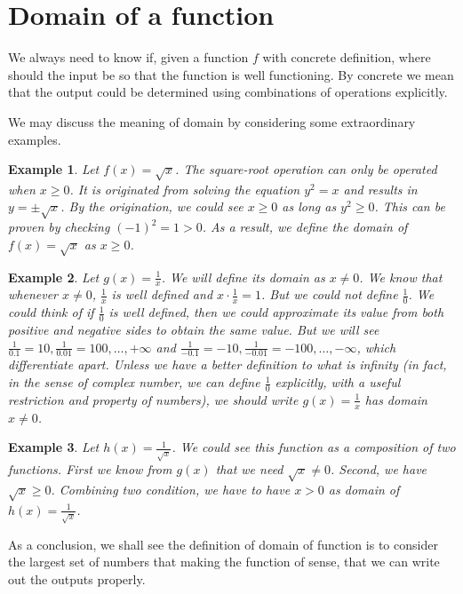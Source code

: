 \documentclass[12pt]{article}
\newtheorem*{example}{Example}
\begin{document}
    \section*{Domain of a function}
    We always need to know if, given a function $f$ with concrete definition, where should the input be so that the function is well functioning. By concrete we mean that the output could be determined using combinations of operations explicitly. 
    
    We may discuss the meaning of domain by considering some extraordinary examples.

    \begin{example}
        Let $f(x)=\sqrt{x}$. The square-root operation can only be operated when $x\geq0$. It is originated from solving the equation $y^2=x$ and results in $y=\pm\sqrt{x}$. By the origination, we could see $x\geq 0$ as long as $y^2\geq 0$. This can be proven by checking $(-1)^2=1>0$. As a result, we define the domain of $f(x)=\sqrt{x}$ as $x\geq0$.
    \end{example}

    \begin{example}
        Let $g(x)=\frac{1}{x}$. We will define its domain as $x\neq 0$. We know that whenever $x\neq 0$, $\frac{1}{x}$ is well defined and $x\cdot\frac{1}{x}=1$. But we could not define $\frac{1}{0}$. We could think of if $\frac{1}{0}$ is well defined, then we could approximate its value from both positive and negative sides to obtain the same value. But we will see $\frac{1}{0.1}=10, \frac{1}{0.01}=100,\dots,+\infty$ and $\frac{1}{-0.1}=-10, \frac{1}{-0.01}=-100,\dots,-\infty$, which differentiate apart. Unless we have a better definition to what is infinity (in fact, in the sense of complex number, we can define $\frac{1}{0}$ explicitly, with a useful restriction and property of numbers), we should write $g(x)=\frac{1}{x}$ has domain $x\neq 0$.
    \end{example}

    \begin{example}
        Let $h(x)=\frac{1}{\sqrt{x}}$. We could see this function as a composition of two functions. First we know from $g(x)$ that we need $\sqrt{x}\neq 0$. Second, we have $\sqrt{x}\geq 0$. Combining two condition, we have to have $x>0$ as domain of $h(x)=\frac{1}{\sqrt{x}}$.
    \end{example}

    As a conclusion, we shall see the definition of domain of function is to consider the largest set of numbers that making the function of sense, that we can write out the outputs properly.
\end{document}
